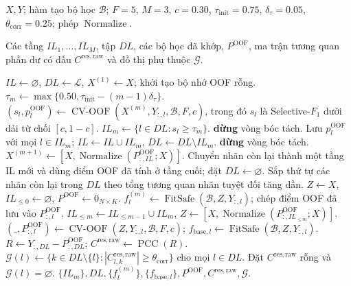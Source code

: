 \documentclass[11pt,a4paper]{article}
\newcounter{alg}
\begin{document}
\begin{algorithm}[H]
\caption{Bóc tách đa tầng, khớp các bộ học và thiết lập phụ thuộc phần dư}
\label{alg:peeling-residual}
\footnotesize
\begin{algorithmic}[1]
\renewcommand{\algorithmicrequire}{\textbf{Đầu vào:}}
\renewcommand{\algorithmicensure}{\textbf{Đầu ra:}}
\REQUIRE \parbox[t]{0.82\linewidth}{\(X,Y\); hàm tạo bộ học \(\mathcal B\); \(F=5\), \(M=3\), \(c=0.30\), \(\tau_{\mathrm{init}}=0.75\), \(\delta_\tau=0.05\), \(\theta_{\mathrm{corr}}=0.25\); phép \(\operatorname{Normalize}\).}
\ENSURE \parbox[t]{0.82\linewidth}{Các tầng \(IL_1,\ldots,IL_M\), tập \(DL\), các bộ học đã khớp, \(P^{\mathrm{OOF}}\), ma trận tương quan phần dư có dấu \(C^{\mathrm{res,raw}}\) và đồ thị phụ thuộc \(\mathcal G\).}
\STATE \(IL\gets\varnothing\), \(DL\gets\mathcal L\), \(X^{(1)}\gets X\); khởi tạo bộ nhớ OOF rỗng.
  \STATE \(\tau_m\gets\max\{0.50,\tau_{\mathrm{init}}-(m-1)\delta_\tau\}\).
    \STATE \((s_l,p_l^{\mathrm{OOF}})\gets\operatorname{CV\text{-}OOF}(X^{(m)},Y_{:,l},\mathcal B,F,c)\), trong đó \(s_l\) là Selective-\(F_1\) dưới dải từ chối \([c,1-c]\).
  \ENDFOR
  \STATE \(IL_m\gets\{l\in DL:s_l\ge\tau_m\}\).
    \STATE \textbf{dừng} vòng bóc tách.
  \ENDIF
  \STATE Lưu \(p_l^{\mathrm{OOF}}\) với mọi \(l\in IL_m\); \(IL\gets IL\cup IL_m\), \(DL\gets DL\setminus IL_m\).
    \STATE \textbf{dừng} vòng bóc tách.
  \ENDIF
  \STATE \(X^{(m+1)}\gets[X,\operatorname{Normalize}(P^{\mathrm{OOF}}_{:,IL};X)]\).
\ENDFOR
{}
  \STATE Chuyển nhãn còn lại thành một tầng IL mới và dùng điểm OOF đã tính ở tầng cuối; đặt \(DL\gets\varnothing\).
\ENDIF
\STATE Sắp thứ tự các nhãn còn lại trong \(DL\) theo tổng tương quan nhãn tuyệt đối tăng dần.
\STATE \(Z\gets X\), \(IL_{\le0}\gets\varnothing\), \(P^{\mathrm{OOF}}\gets0_{N\times K}\).
    \STATE \(f_l^{(m)}\gets\operatorname{FitSafe}(\mathcal B,Z,Y_{:,l})\); chép điểm OOF đã lưu vào \(P^{\mathrm{OOF}}_{:,l}\).
  \ENDFOR
  \STATE \(IL_{\le m}\gets IL_{\le m-1}\cup IL_m\), \(Z\gets[X,\operatorname{Normalize}(P^{\mathrm{OOF}}_{:,IL_{\le m}};X)]\).
\ENDFOR
{}
  \STATE \((\_,P^{\mathrm{OOF}}_{:,l})\gets\operatorname{CV\text{-}OOF}(Z,Y_{:,l},\mathcal B,F,c)\); \(f_{\mathrm{base},l}\gets\operatorname{FitSafe}(\mathcal B,Z,Y_{:,l})\).
\ENDFOR
{}
  \STATE \(R\gets Y_{:,DL}-P^{\mathrm{OOF}}_{:,DL}\); \(C^{\mathrm{res,raw}}\gets\operatorname{PCC}(R)\).
  \STATE \(\mathcal G(l)\gets\{k\in DL\setminus\{l\}:|C^{\mathrm{res,raw}}_{l,k}|\ge\theta_{\mathrm{corr}}\}\) cho mọi \(l\in DL\).
\ELSE
  \STATE Đặt \(C^{\mathrm{res,raw}}\) rỗng và \(\mathcal G(l)=\varnothing\).
\ENDIF
\RETURN \(\{IL_m\},DL,\{f_l^{(m)}\},\{f_{\mathrm{base},l}\},P^{\mathrm{OOF}},C^{\mathrm{res,raw}},\mathcal G\).
\end{algorithmic}
\end{algorithm}
\end{document}
